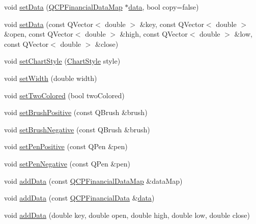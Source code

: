 \begin{DoxyCompactItemize}
\item 
void \hyperlink{class_q_c_p_financial_adf12a86082f1e488df6a4e8603f8fd6d}{set\+Data} (\hyperlink{qcustomplot_8h_a745c09823fae0974b50beca9bc3b3d7d}{Q\+C\+P\+Financial\+Data\+Map} $\ast$\hyperlink{class_q_c_p_financial_a58e05aefa057d16edfcc0334cf81c241}{data}, bool copy=false)
\item 
void \hyperlink{class_q_c_p_financial_a886881339d6447432af55adaad748c3c}{set\+Data} (const Q\+Vector$<$ double $>$ \&key, const Q\+Vector$<$ double $>$ \&open, const Q\+Vector$<$ double $>$ \&high, const Q\+Vector$<$ double $>$ \&low, const Q\+Vector$<$ double $>$ \&close)
\item 
void \hyperlink{class_q_c_p_financial_a5a59175d36279d71596e64d7bb65596f}{set\+Chart\+Style} (\hyperlink{class_q_c_p_financial_a0f800e21ee98d646dfc6f8f89d10ebfb}{Chart\+Style} style)
\item 
void \hyperlink{class_q_c_p_financial_a99633f8bac86a61d534ae5eeb1a3068f}{set\+Width} (double width)
\item 
void \hyperlink{class_q_c_p_financial_a138e44aac160a17a9676652e240c5f08}{set\+Two\+Colored} (bool two\+Colored)
\item 
void \hyperlink{class_q_c_p_financial_a5ebff2b1764efd07cc44942e67821829}{set\+Brush\+Positive} (const Q\+Brush \&brush)
\item 
void \hyperlink{class_q_c_p_financial_a8bbdd87629f9144b3ef51af660c0961a}{set\+Brush\+Negative} (const Q\+Brush \&brush)
\item 
void \hyperlink{class_q_c_p_financial_ac58aa3adc7a35aab0088764b840683e5}{set\+Pen\+Positive} (const Q\+Pen \&pen)
\item 
void \hyperlink{class_q_c_p_financial_afe5c07e94ccea01a75b3a2476993c346}{set\+Pen\+Negative} (const Q\+Pen \&pen)
\item 
void \hyperlink{class_q_c_p_financial_a1a83396f97fcc68f2b7aa8d9782feffe}{add\+Data} (const \hyperlink{qcustomplot_8h_a745c09823fae0974b50beca9bc3b3d7d}{Q\+C\+P\+Financial\+Data\+Map} \&data\+Map)
\item 
void \hyperlink{class_q_c_p_financial_a3b6144b48a6a8e63236fc5bf70d40c00}{add\+Data} (const \hyperlink{class_q_c_p_financial_data}{Q\+C\+P\+Financial\+Data} \&\hyperlink{class_q_c_p_financial_a58e05aefa057d16edfcc0334cf81c241}{data})
\item 
void \hyperlink{class_q_c_p_financial_a688bbd052e00a02954ddb0068b378170}{add\+Data} (double key, double open, double high, double low, double close)
\item 

\end{DoxyCompactItemize}
